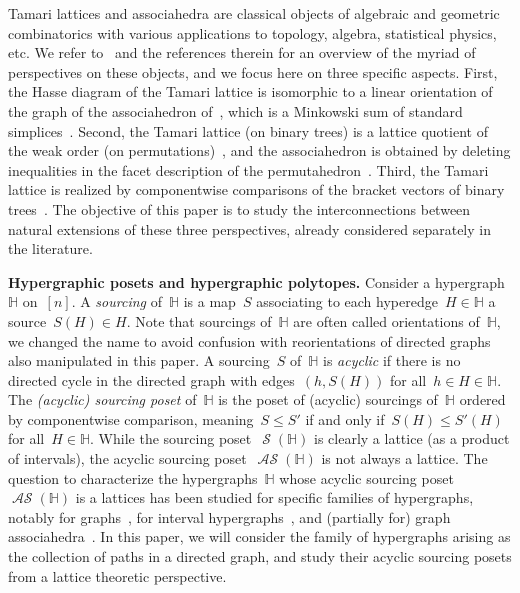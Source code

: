 \documentclass{amsart}
\theoremstyle{definition}
\newcommand{\para}[1]{\bigskip\noindent\textbf{#1}} %
\newcommand{\darkblue}{\color{darkblue}} %
\newcommand{\defn}[1]{\textsl{\darkblue #1}} %
\DeclareMathOperator{\Sour}{\mathcal{S}}  %
\DeclareMathOperator{\ASour}{\mathcal{AS}}  %
\newcommand{\HH}{\mathbb H}  %
\begin{document}
Tamari lattices and associahedra are classical objects of algebraic and geometric combinatorics with various applications to topology, algebra, statistical physics, etc.
We refer to~\cite{TamariFestschrift, CeballosSantosZiegler, PilaudSantosZiegler} and the references therein for an overview of the myriad of  perspectives on these objects, and we focus here on three specific aspects.
First, the Hasse diagram of the Tamari lattice is isomorphic to a linear orientation of the graph of the associahedron of~\cite{ShniderSternberg, Loday}, which is a Minkowski sum of standard simplices~\cite{Postnikov}. 
Second, the Tamari lattice (on binary trees) is a lattice quotient of the weak order (on permutations)~\cite{Tonks, Reading-latticeCongruences}, and the associahedron is obtained by deleting inequalities in the facet description of the permutahedron~\cite{ShniderSternberg, Loday}.
Third, the Tamari lattice is realized by componentwise comparisons of the bracket vectors of binary trees~\cite{HuangTamari}.
The objective of this paper is to study the interconnections between natural extensions of these three perspectives, already considered separately in the literature.


\para{Hypergraphic posets and hypergraphic polytopes.}
Consider a hypergraph~$\HH$ on~$[n]$.
A \defn{sourcing} of~$\HH$ is a map~$S$ associating to each hyperedge~$H \in \HH$ a source~$S(H) \in H$.
Note that sourcings of~$\HH$ are often called orientations of~$\HH$, we changed the name to avoid confusion with reorientations of directed graphs also manipulated in this paper.
A sourcing~$S$ of~$\HH$ is \defn{acyclic} if there is no directed cycle in the directed graph with edges~$(h,S(H))$ for all~$h \in H \in \HH$.
The \defn{(acyclic) sourcing poset} of~$\HH$ is the poset of (acyclic) sourcings of~$\HH$ ordered by componentwise comparison, meaning~$S \le S'$ if and only if~$S(H) \le S'(H)$ for all~$H \in \HH$.
While the sourcing poset~$\Sour(\HH)$ is clearly a lattice (as a product of intervals), the acyclic sourcing poset~$\ASour(\HH)$ is not always a lattice.
The question to characterize the hypergraphs~$\HH$ whose acyclic sourcing poset~$\ASour(\HH)$ is a lattices has been studied for specific families of hypergraphs, notably for graphs~\cite{Pilaud-acyclicReorientationLattices}, for interval hypergraphs~\cite{BergeronPilaud}, and (partially for) graph associahedra~\cite{BarnardMcConville}.
In this paper, we will consider the family of hypergraphs arising as the collection of paths in a directed graph, and study their acyclic sourcing posets from a lattice theoretic perspective.
\end{document}
